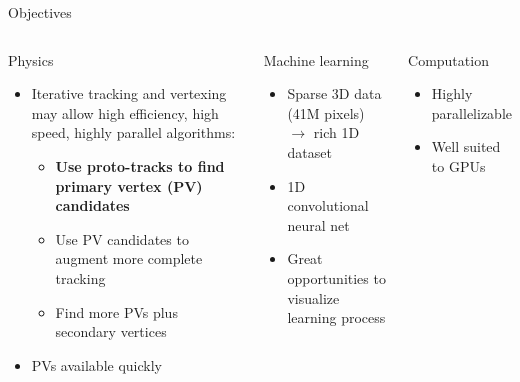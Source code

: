 \begin{frame}{Objectives}
\begin{columns}[c]
    \begin{block}{Physics}
    \begin{itemize}
        \item Iterative tracking and vertexing may allow high efficiency, high speed, highly parallel algorithms:
        \begin{itemize}
            \item \textbf{Use proto-tracks to find primary vertex (PV) candidates}
            \item Use PV candidates to augment more complete tracking
            \item Find more PVs plus secondary vertices
        \end{itemize}
        \item PVs available quickly
    \end{itemize}
    \end{block}
    \begin{block}{Machine learning}
    \begin{itemize}
        \item Sparse 3D data (41M pixels) $\to$ rich 1D dataset
        \item 1D convolutional neural net
        \item Great opportunities to visualize learning process
    \end{itemize}
    \end{block}

    \begin{block}{Computation}
    \begin{itemize}
        \item Highly parallelizable
        \item Well suited to GPUs
    \end{itemize}
    \end{block}
\end{columns}
\end{frame}
